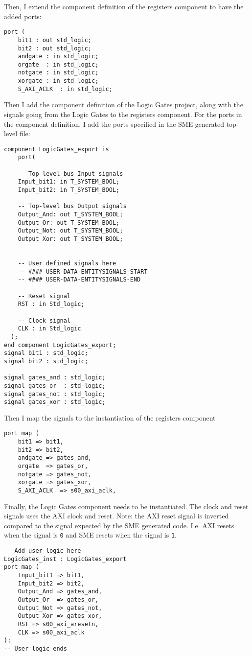 Then, I extend the component definition of the registers component to have
the added ports:
\begin{lstlisting}
port (
    bit1 : out std_logic;
    bit2 : out std_logic;
    andgate : in std_logic;
    orgate  : in std_logic;
    notgate : in std_logic;
    xorgate : in std_logic;
    S_AXI_ACLK  : in std_logic;
\end{lstlisting}
Then I add the component definition of the Logic Gates project, along with
the signals going from the Logic Gates to the registers component. For the
ports in the component definition, I add the ports specified in the SME
generated top-level file:
\newpage
\begin{lstlisting}
component LogicGates_export is
    port(

    -- Top-level bus Input signals
    Input_bit1: in T_SYSTEM_BOOL;
    Input_bit2: in T_SYSTEM_BOOL;

    -- Top-level bus Output signals
    Output_And: out T_SYSTEM_BOOL;
    Output_Or: out T_SYSTEM_BOOL;
    Output_Not: out T_SYSTEM_BOOL;
    Output_Xor: out T_SYSTEM_BOOL;


    -- User defined signals here
    -- #### USER-DATA-ENTITYSIGNALS-START
    -- #### USER-DATA-ENTITYSIGNALS-END

    -- Reset signal
    RST : in Std_logic;

    -- Clock signal
    CLK : in Std_logic
  );
end component LogicGates_export;
signal bit1 : std_logic;
signal bit2 : std_logic;

signal gates_and : std_logic;
signal gates_or  : std_logic;
signal gates_not : std_logic;
signal gates_xor : std_logic;
\end{lstlisting}
Then I map the signals to the instantiation of the registers component
\begin{lstlisting}
port map (
    bit1 => bit1,
    bit2 => bit2,
    andgate => gates_and,
    orgate  => gates_or,
    notgate => gates_not,
    xorgate => gates_xor,
    S_AXI_ACLK  => s00_axi_aclk,
\end{lstlisting}
Finally, the Logic Gates component needs to be instantiated. The clock and reset
signals uses the AXI clock and reset. Note: the AXI reset signal is
inverted compared to the signal expected by the SME generated code. I.e. AXI
resets when the signal is \texttt{0} and SME resets when the signal is
\texttt{1}.
\newpage
\begin{lstlisting}
-- Add user logic here
LogicGates_inst : LogicGates_export
port map (
    Input_bit1 => bit1,
    Input_bit2 => bit2,
    Output_And => gates_and,
    Output_Or  => gates_or,
    Output_Not => gates_not,
    Output_Xor => gates_xor,
    RST => s00_axi_aresetn,
    CLK => s00_axi_aclk
);
-- User logic ends
\end{lstlisting}
